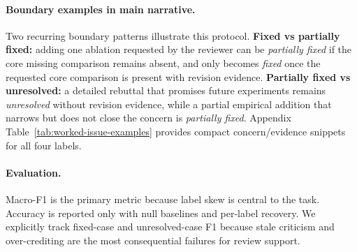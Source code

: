 \paragraph{Boundary examples in main narrative.}
Two recurring boundary patterns illustrate this protocol.
\textbf{Fixed vs partially fixed:} adding one ablation requested by the reviewer can be \textit{partially fixed} if the core missing comparison remains absent, and only becomes \textit{fixed} once the requested core comparison is present with revision evidence.
\textbf{Partially fixed vs unresolved:} a detailed rebuttal that promises future experiments remains \textit{unresolved} without revision evidence, while a partial empirical addition that narrows but does not close the concern is \textit{partially fixed}.
Appendix Table~\ref{tab:worked-issue-examples} provides compact concern/evidence snippets for all four labels.

\paragraph{Evaluation.}
Macro-F1 is the primary metric because label skew is central to the task.
Accuracy is reported only with null baselines and per-label recovery.
We explicitly track fixed-case and unresolved-case F1 because stale criticism and over-crediting are the most consequential failures for review support.
